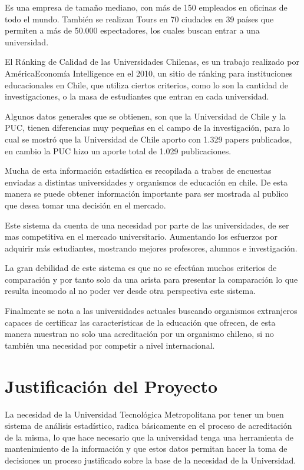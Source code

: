 \documentclass[a4paper,12pt,openany,oneside]{book}
\begin{document}
Es una empresa de tamaño mediano, con más de 150 empleados en oficinas de todo el mundo. También se realizan Tours en 70 ciudades en 39 países que permiten a más de 50.000 espectadores, los cuales buscan entrar a una universidad\cite{data2}.

El Ránking de Calidad de las Universidades Chilenas, es un trabajo realizado por AméricaEconomía Intelligence en el 2010, un sitio de ránking para instituciones educacionales en Chile, que utiliza ciertos criterios, como lo son la cantidad de investigaciones, o la masa de estudiantes que entran en cada universidad.

Algunos datos generales que se obtienen, son que la Universidad de Chile y la PUC, tienen diferencias muy pequeñas en el campo de la investigación, para lo cual se mostró que la Universidad de Chile aporto con 1.329 papers publicados, en cambio la PUC hizo un aporte total de 1.029 publicaciones.

Mucha de esta información estadística es recopilada a trabes de encuestas enviadas a distintas universidades y organismos de educación en chile. De esta manera se puede obtener información importante para ser mostrada al publico que desea tomar una decisión en el mercado.

Este sistema da cuenta de una necesidad por parte de las universidades, de ser mas competitiva en el mercado universitario. Aumentando los esfuerzos por adquirir más estudiantes, mostrando mejores profesores, alumnos e investigación.

La gran debilidad de este sistema es que no se efectúan muchos criterios de comparación y por tanto solo da una arista para presentar la comparación lo que resulta incomodo al no poder ver desde otra perspectiva este sistema.

Finalmente se nota a las universidades actuales buscando organismos extranjeros capaces de certificar las características de la educación que ofrecen, de esta manera muestran no solo una acreditación por un organismo chileno, si no también una necesidad por competir a nivel internacional\cite{data3}.

\section{Justificación del Proyecto}
La necesidad de la Universidad Tecnológica Metropolitana por tener un buen sistema de análisis estadístico, radica básicamente en el proceso de acreditación de la misma, lo que hace necesario que la universidad tenga una herramienta de mantenimiento de la información y que estos datos permitan hacer la toma de decisiones un proceso justificado sobre la base de la necesidad de la Universidad.
\end{document}
